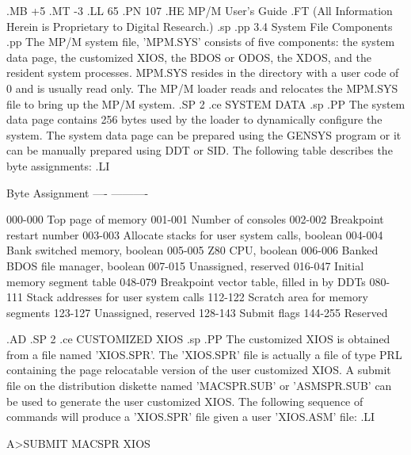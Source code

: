 .MB +5
.MT -3
.LL 65
.PN 107
.HE MP/M User's Guide
.FT   (All Information Herein is Proprietary to Digital Research.)
.sp
.pp
3.4  System File Components
.pp
The MP/M system file, 'MPM.SYS' consists of five components: the
system data page, the customized XIOS, the BDOS or ODOS, the XDOS, and the
resident system processes.
MPM.SYS resides in the directory with a user code of 0 and is
usually read only.  The MP/M loader reads and relocates the MPM.SYS
file to bring up the MP/M system.
.SP 2
.ce
SYSTEM DATA
.sp
.PP
The system data page contains 256 bytes used by the loader to
dynamically configure the system.  The system data page can be
prepared using the GENSYS program or it can be manually prepared
using DDT or SID.  The following table describes the byte
assignments:
.LI

	Byte	Assignment
	----    ----------

	000-000 Top page of memory
	001-001 Number of consoles
	002-002 Breakpoint restart number
	003-003 Allocate stacks for user system calls, boolean
	004-004 Bank switched memory, boolean
	005-005 Z80 CPU, boolean
	006-006 Banked BDOS file manager, boolean
	007-015 Unassigned, reserved
	016-047 Initial memory segment table
	048-079 Breakpoint vector table, filled in by DDTs
	080-111 Stack addresses for user system calls
	112-122 Scratch area for memory segments
	123-127 Unassigned, reserved
	128-143 Submit flags
	144-255 Reserved

.AD
.SP 2
.ce
CUSTOMIZED XIOS
.sp
.PP
The customized XIOS is obtained from a file named 'XIOS.SPR'. The
'XIOS.SPR' file is actually a file of type PRL containing the
page relocatable version of the user customized XIOS.  A submit
file on the distribution diskette named 'MACSPR.SUB' or 'ASMSPR.SUB' can be used
to generate the user customized XIOS.  The following sequence of
commands will produce a 'XIOS.SPR' file given a user 'XIOS.ASM'
file:
.LI

	A>SUBMIT MACSPR XIOS

